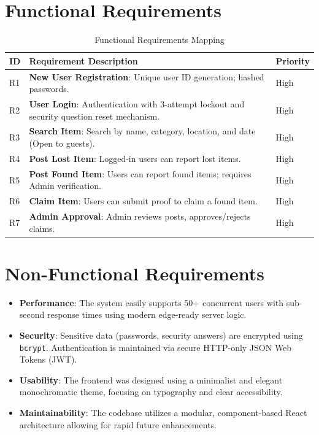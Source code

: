 \documentclass[12pt, a4paper]{article}
\begin{document}
\section{Functional Requirements}
\begin{table}[H]
    \centering
    \begin{tabularx}{\textwidth}{|l|X|l|}
        \hline
        \textbf{ID} & \textbf{Requirement Description} & \textbf{Priority} \\
        \hline
        R1 & \textbf{New User Registration}: Unique user ID generation; hashed passwords. & High \\
        \hline
        R2 & \textbf{User Login}: Authentication with 3-attempt lockout and security question reset mechanism. & High \\
        \hline
        R3 & \textbf{Search Item}: Search by name, category, location, and date (Open to guests). & High \\
        \hline
        R4 & \textbf{Post Lost Item}: Logged-in users can report lost items. & High \\
        \hline
        R5 & \textbf{Post Found Item}: Users can report found items; requires Admin verification. & High \\
        \hline
        R6 & \textbf{Claim Item}: Users can submit proof to claim a found item. & High \\
        \hline
        R7 & \textbf{Admin Approval}: Admin reviews posts, approves/rejects claims. & High \\
        \hline
    \end{tabularx}
    \caption{Functional Requirements Mapping}
\end{table}

\section{Non-Functional Requirements}
\begin{itemize}
    \item \textbf{Performance}: The system easily supports 50+ concurrent users with sub-second response times using modern edge-ready server logic.
    \item \textbf{Security}: Sensitive data (passwords, security answers) are encrypted using \texttt{bcrypt}. Authentication is maintained via secure HTTP-only JSON Web Tokens (JWT).
    \item \textbf{Usability}: The frontend was designed using a minimalist and elegant monochromatic theme, focusing on typography and clear accessibility.
    \item \textbf{Maintainability}: The codebase utilizes a modular, component-based React architecture allowing for rapid future enhancements.
\end{itemize}
\end{document}
